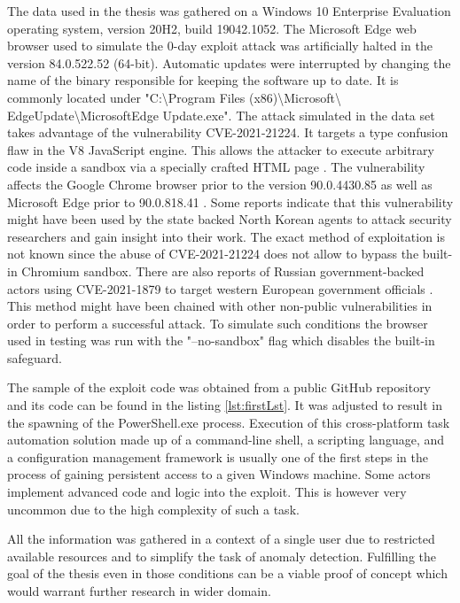 \documentclass[a4paper,twoside,12pt]{book}
\begin{document}
The data used in the thesis was gathered on a Windows 10 Enterprise Evaluation operating 
system, version 20H2, build 19042.1052. The Microsoft Edge web browser used to simulate 
the 0-day exploit attack was artificially halted in the version 84.0.522.52 (64-bit). 
Automatic updates were interrupted by changing the name of the binary responsible for 
keeping the software up to date. It is commonly located under 
"C:\textbackslash Program Files (x86)\textbackslash Microsoft\textbackslash
EdgeUpdate\textbackslash MicrosoftEdge\newline
Update.exe". 
The attack simulated in the data set takes advantage of the vulnerability CVE-2021-21224. It 
targets a type confusion flaw in the V8 JavaScript engine. This allows the attacker to 
execute arbitrary code inside a sandbox via a specially crafted HTML page \cite{bib:CVE21224}. 
The vulnerability affects the Google Chrome browser prior to the version 90.0.4430.85 as 
well as Microsoft Edge prior to 90.0.818.41 \cite{bib:edgeRelease}. Some reports indicate 
that this vulnerability might have been used by the state backed North Korean agents to 
attack security researchers and gain insight into their work. The exact method of
exploitation is not known since the abuse of CVE-2021-21224 does not allow to bypass 
the built-in Chromium sandbox. There are also reports of Russian government-backed actors 
using CVE-2021-1879 to target western European government officials \cite{bib:googleBlog}. 
This method might have been chained with other non-public vulnerabilities in order to 
perform a successful attack. To simulate such conditions the browser used in testing was 
run with the "--no-sandbox" flag which disables the built-in safeguard.

The sample of the exploit code was obtained from a public GitHub repository 
\cite{bib:sampleExploit} and its code can be found in the listing \ref{lst:firstLst}. 
It was adjusted to result in the spawning of the PowerShell.exe process. Execution of this 
cross-platform task automation solution made up of a command-line shell, a scripting 
language, and a configuration management framework is usually one of the first steps in 
the process of gaining persistent access to a given Windows machine. Some actors implement advanced 
code and logic into the exploit. This is however very uncommon due to the high complexity 
of such a task.

All the information was gathered in a context of a single user due to restricted available
resources and to simplify the task of anomaly detection. Fulfilling the goal of the thesis
even in those conditions can be a viable proof of concept which would warrant further 
research in wider domain.  
\end{document}
